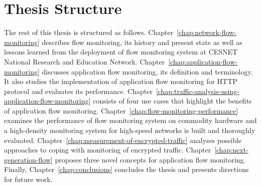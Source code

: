 \section{Thesis Structure}

The rest of this thesis is structured as follows. Chapter~\ref{chap:network-flow-monitoring} describes flow monitoring, its history and present state as well as lessons learned from the deployment of flow monitoring system at CESNET National Research and Education Network. Chapter~\ref{chap:application-flow-monitoring} discusses application flow monitoring, its definition and terminology.  It also studies the implementation of application flow monitoring for HTTP protocol and evaluates its performance. Chapter~\ref{chap:traffic-analysis-using-application-flow-monitoring} consists of four use cases that highlight the benefits of application flow monitoring. Chapter~\ref{chap:flow-monitoring-performance} examines the performance of flow monitoring system on commodity hardware and a high-density monitoring system for high-speed networks is built and thoroughly evaluated. Chapter~\ref{chap:measurement-of-encrypted-traffic} analyses possible approaches to coping with monitoring of encrypted traffic. Chapter~\ref{chap:next-generation-flow} proposes three novel concepts for application flow monitoring. Finally, Chapter~\ref{chap:conclusions} concludes the thesis and presents directions for future work.